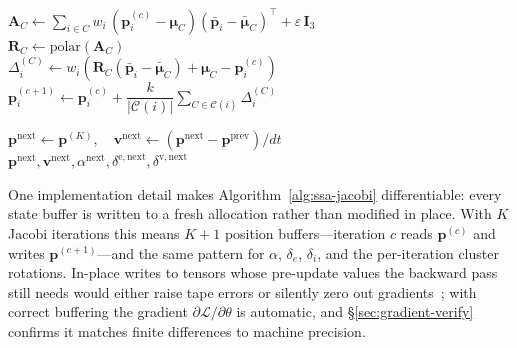 \documentclass[letterpaper, 10 pt, conference]{ieeeconf}  %
\newcommand{\mycmt}[1]{\tcp*[f]{\textcolor{green!50!black}{\fontsize{7}{8}\selectfont #1}}}
\theoremstyle{tight}
\begin{document}
\begin{algorithm}[!htbp]
{{    $\mathbf{A}_C \leftarrow \sum_{i \in C} w_i\,
       (\mathbf{p}^{(c)}_i - \boldsymbol{\mu}_C)
       (\bar{\mathbf{p}}_i - \bar{\boldsymbol{\mu}}_C)^{\!\top}
       + \varepsilon\,\mathbf{I}_3$\\
 
    $\mathbf{R}_C \leftarrow \mathrm{polar}(\mathbf{A}_C)$\\
 
    $\Delta_i^{(C)} \leftarrow
     w_i\!\left(\mathbf{R}_C(\bar{\mathbf{p}}_i - \bar{\boldsymbol{\mu}}_C)
     + \boldsymbol{\mu}_C - \mathbf{p}^{(c)}_i\right)$
    \mycmt{Eq.~\ref{eq:cluster-correction}}\\
  }
  $\mathbf{p}^{(c+1)}_i \leftarrow \mathbf{p}^{(c)}_i +
   \dfrac{k}{|\mathcal{C}(i)|}\!\sum_{C \in \mathcal{C}(i)} \Delta_i^{(C)}$
  \mycmt{Eq.~\ref{eq:apply}; fresh buffer}\\
}
 
$\mathbf{p}^{\mathrm{next}} \leftarrow \mathbf{p}^{(K)},\quad
 \mathbf{v}^{\mathrm{next}} \leftarrow
 (\mathbf{p}^{\mathrm{next}} - \mathbf{p}^{\mathrm{prev}})/dt$\\
 
\Return $\mathbf{p}^{\mathrm{next}}, \mathbf{v}^{\mathrm{next}},
        \alpha^{\mathrm{next}},
        \delta^{\mathrm{e,next}}, \delta^{\mathrm{v,next}}$
\vspace{6pt}
\end{algorithm}
 
One implementation detail makes Algorithm~\ref{alg:ssa-jacobi}
differentiable: every state buffer is written to a fresh allocation
rather than modified in place. With $K$ Jacobi iterations this means
$K{+}1$ position buffers---iteration $c$ reads $\mathbf{p}^{(c)}$ and
writes $\mathbf{p}^{(c+1)}$---and the same pattern for $\alpha$,
$\delta_e$, $\delta_i$, and the per-iteration cluster rotations.
In-place writes to tensors whose pre-update values the backward pass
still needs would either raise tape errors or silently zero out
gradients~\cite{difftaichi}; with correct buffering the gradient
$\partial\mathcal{L}/\partial\theta$ is automatic, and
\S\ref{sec:gradient-verify} confirms it matches finite differences to
machine precision.
 
 
%
\end{document}
